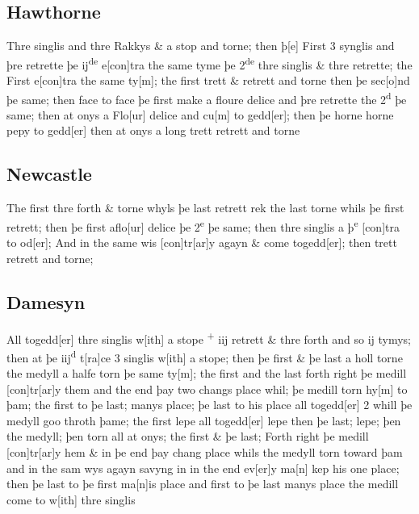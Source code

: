 \documentclass[12pt,letter]{article} %
\newcommand{\srcpg}[1]{
    \noindent{
        \color{Gray}{\rule[0.5ex]{\linewidth}{1pt}~#1} 
    
    }
}
\begin{document}
\subsection{Hawthorne}
\srcpg{67} Thre singlis and thre Rakkys \& a
stop and torne; then þ{[}e{]} First 3 synglis and þre retrette þe
ij\textsuperscript{de} e{[}con{]}tra the same tyme þe
2\textsuperscript{de} thre singlis \& thre retrette; the First
e{[}con{]}tra the same ty{[}m{]}; the first trett \& retrett and torne
then þe sec{[}o{]}nd þe same; then face to face þe first make a floure
delice and þre retrette the 2\textsuperscript{d} þe same; then at onys a
Flo{[}ur{]} delice and cu{[}m{]} to gedd{[}er{]}; then þe horne horne
pepy to gedd{[}er{]} then at onys a long trett retrett and torne

\subsection{Newcastle}
The first thre forth \& torne whyls þe last retrett rek the last torne
whils þe first retrett; then þe first aflo{[}ur{]} delice þe
2\textsuperscript{e} þe same; then thre singlis a þ\textsuperscript{e}
{[}con{]}tra to od{[}er{]}; \srcpg{68} And in the same wis
{[}con{]}tr{[}ar{]}y agayn \& come togedd{[}er{]}; then trett retrett
and torne;

\subsection{Damesyn}
All togedd{[}er{]} thre singlis w{[}ith{]} a stope \textsuperscript{+}
iij retrett \& thre forth and so ij tymys; then at þe
\reversemarginpar{}iij\textsuperscript{d} t{[}ra{]}ce 3 singlis w{[}ith{]} a stope; then þe
first \& þe last a holl torne the medyll a halfe torn þe same ty{[}m{]};
the first and the last forth right þe medill {[}con{]}tr{[}ar{]}y them
and the end þay two changs place whil; þe medill torn hy{[}m{]} to þam;
the first to þe last; manys place; þe last to his place all
togedd{[}er{]} 2 whill þe medyll goo throth þame; the first lepe all
togedd{[}er{]} lepe then þe last; lepe; þen the medyll; þen torn all at
onys; the first \& þe last; \srcpg{69} Forth right þe medill
{[}con{]}tr{[}ar{]}y hem \& in þe end þay chang place whils the medyll
torn toward þam and in the sam wys agayn savyng in in the end
ev{[}er{]}y ma{[}n{]} kep his one place; then þe last to þe first
ma{[}n{]}is place and first to þe last manys place the medill come to
w{[}ith{]} thre singlis
\end{document}
